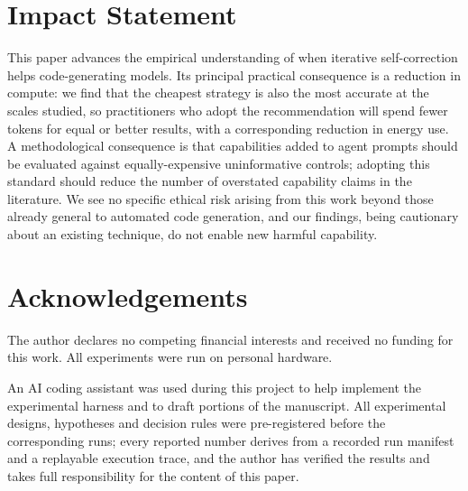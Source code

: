 \documentclass{article}
\begin{document}




\section*{Impact Statement}

This paper advances the empirical understanding of when iterative
self-correction helps code-generating models. Its principal practical
consequence is a reduction in compute: we find that the cheapest strategy is
also the most accurate at the scales studied, so practitioners who adopt the
recommendation will spend fewer tokens for equal or better results, with a
corresponding reduction in energy use. A methodological consequence is that
capabilities added to agent prompts should be evaluated against
equally-expensive uninformative controls; adopting this standard should reduce
the number of overstated capability claims in the literature. We see no
specific ethical risk arising from this work beyond those already general to
automated code generation, and our findings, being cautionary about an existing
technique, do not enable new harmful capability.

\section*{Acknowledgements}

The author declares no competing financial interests and received no funding
for this work. All experiments were run on personal hardware.

An AI coding assistant was used during this project to help implement the
experimental harness and to draft portions of the manuscript. All experimental
designs, hypotheses and decision rules were pre-registered before the
corresponding runs; every reported number derives from a recorded run manifest
and a replayable execution trace, and the author has verified the results and
takes full responsibility for the content of this paper.
\end{document}
